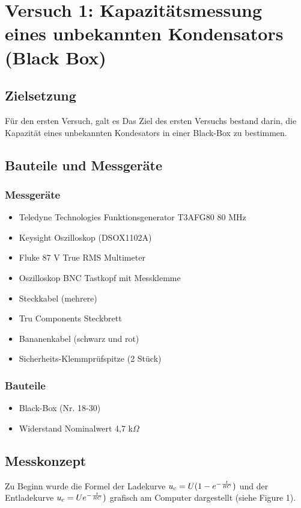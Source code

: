 \documentclass[a4paper,12pt]{article}
\begin{document}
\newpage

\section{Versuch 1: Kapazitätsmessung eines unbekannten Kondensators (Black Box)}

\subsection{Zielsetzung}
Für den ersten Versuch, galt es Das Ziel des ersten Versuchs bestand darin, die Kapazität eines unbekannten Kondesators in einer Black-Box zu bestimmen. 

\subsection{Bauteile und Messgeräte}
\subsubsection*{Messgeräte}
\begin{itemize}
\item Teledyne Technologies Funktionsgenerator T3AFG80 80 MHz
\item Keysight Oszilloskop (DSOX1102A)
\item Fluke 87 V True RMS Multimeter
\item Oszilloskop BNC Tastkopf mit Messklemme
\item Steckkabel (mehrere)
\item Tru Components Steckbrett
\item Bananenkabel (schwarz und rot)
\item Sicherheits-Klemmprüfspitze (2 Stück)
\end{itemize}

\subsubsection*{Bauteile}
\begin{itemize}
\item Black-Box (Nr. 18-30)
\item Widerstand Nominalwert 4,7 k$\Omega$
\end{itemize}




\subsection{Messkonzept}
Zu Beginn wurde die Formel der Ladekurve \( u\textsubscript{c} = U (1 -e ^{-\frac{t}{RC}}) \) und der Entladekurve  \( u\textsubscript{c} = Ue ^{-\frac{t}{RC}}) \) grafisch am Computer dargestellt (siehe Figure 1). 
\end{document}
